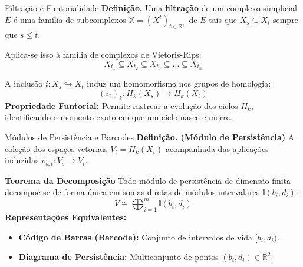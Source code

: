 \documentclass[aspectratio=169]{beamer}
\begin{document}
\begin{frame}{Filtração e Funtorialidade}
    \textbf{Definição.} Uma \textbf{filtração} de um complexo simplicial $E$ é uma família de subcomplexos $\mathbb{X} = (X^t)_{t \in \mathbb{R}^+}$ de $E$ tais que $X_s \subseteq X_t$ sempre que $s \leq t$.
    \vspace{0.3cm}
    
    Aplica-se isso à família de complexos de Vietoris-Rips:
    \[
        X_{t_1} \subseteq X_{t_2} \subseteq X_{t_3} \subseteq \dots \subseteq X_{t_n}
    \]
    
    A inclusão $i: X_s \hookrightarrow X_t$ induz um homomorfismo nos grupos de homologia:
    \[
        (i_*)_k: H_k(X_s) \longrightarrow H_k(X_t)
    \]
    \textbf{Propriedade Funtorial:} Permite rastrear a evolução dos ciclos $H_k$, identificando o momento exato em que um ciclo nasce e morre.
\end{frame}

\begin{frame}{Módulos de Persistência e Barcodes}
    \textbf{Definição. (Módulo de Persistência)} A coleção dos espaços vetoriais $V_t = H_k(X_t)$ acompanhada das aplicações induzidas $v_{s,t}: V_s \to V_t$.
    \vspace{0.5cm}

    \textbf{Teorema da Decomposição} Todo módulo de persistência de dimensão finita decompoe-se de forma única em somas diretas de módulos intervalares $\mathbb{I}(b_i, d_i)$:
    \[
        V \cong \bigoplus_{i=1}^m \mathbb{I}(b_i, d_i)
    \]
    \textbf{Representações Equivalentes:}
    \begin{itemize}
        \item \textbf{Código de Barras (Barcode):} Conjunto de intervalos de vida $[b_i, d_i)$.
        \item \textbf{Diagrama de Persistência:} Multiconjunto de pontos $(b_i, d_i) \in \mathbb{R}^2$.
    \end{itemize}
    \vspace{0.2cm}
\end{frame}
\end{document}
